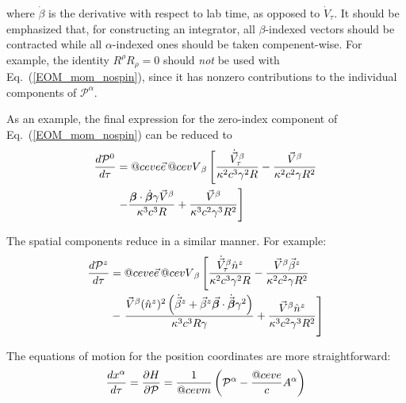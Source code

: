 \documentclass[reprint,
               amsmath,amssymb,nofootinbib, aps%
              ]{revtex4-2}
\makeatletter
\DeclareRobustCommand{\cev}[1]{%
  {\mathpalette\do@cev{#1}}%
}
\newcommand{\do@cev}[2]{%
  \vbox{\offinterlineskip
    \sbox\z@{$\m@th#1 x$}%
    \ialign{##\cr
      \hidewidth\reflectbox{$\m@th#1\vec{}\mkern4mu$}\hidewidth\cr
      \noalign{\kern-\ht\z@}
      $\m@th#1#2$\cr
    }%
  }%
}
\makeatother
\begin{document}
where $\dot{\beta}$ is the derivative with respect to lab time, as opposed to $\dot{V}_\tau$.
\noindent It should be emphasized that, for constructing an integrator, all $\beta$-indexed vectors should be contracted while all $\alpha$-indexed ones should be taken compenent-wise. For example, the identity $R^{\rho} R_{\rho} = 0 $ should \textit{not} be used with Eq.~(\ref{EOM_mom_nospin}), since it has nonzero contributions to the individual components of $\mathcal{P}^{\alpha}$.

As an example, the final expression for the zero-index component of Eq.~(\ref{EOM_mom_nospin}) can be reduced to 
\begin{align}
    \frac{d \mathcal{P}^0}{d \tau} &= 
    \cev{e}  \vec{e} \, \cev{V}_{\beta} \left[ 
    \frac{\dot{\vec{V}}^\beta_\tau} {\kappa^{2} c^{3} \gamma^{2} R}
    \nonumber - \frac{ \vec{V}^{\beta}} {\kappa^{2} c^{2} \gamma R^{2}} \right.
    \noindent \\
    & \left. -\frac{\boldsymbol{\beta}\cdot\dot{\boldsymbol{\beta}} \gamma \vec{V}^{\beta}}{\kappa^3 c^{3} R} 
    +  \frac{\vec{V}^{\beta} }{\kappa^3 c^{2} \gamma^{3} R^{2}}
    \right]
    \label{eq:eoms_mom_trans}
\end{align}

\noindent The spatial components reduce in a similar manner. For example:
\vspace{-0.2cm}
\begin{align}
    \frac{d \mathcal{P}^z}{d \tau} &= 
    \cev{e}  \vec{e} \, \cev{V}_{\beta} \left[ 
    \frac{\dot{\vec{V}}^\beta_\tau \hat{n}^{z}} {\kappa^2 c^{3} \gamma^{2} R}
    \nonumber - \frac{ \vec{V}^{\beta} \vec{\beta}^{z}} {\kappa^2 c^{2} \gamma R^{2}} \right.
    \noindent \\
    &- \left. \frac{ \vec{V}^{\beta} (\hat{n}^z)^2 \left(\dot{\vec{\beta}}^z + \vec{\beta}^z \vec{\boldsymbol{\beta}}\cdot\dot{\vec{\boldsymbol{\beta}}} \gamma^{2}\right)}{\kappa^3 c^{3} R \gamma} 
    +  \frac{\vec{V}^{\beta} \hat{n}^{z} }{\kappa^3 c^{2} \gamma^{3} R^{2}}
    \right]
    \label{eq:eoms_mom_long}
\end{align}

The equations of motion for the position coordinates are more straightforward:
\vspace{0.1cm}
\begin{equation}
\frac{d x^{\alpha}}{d \tau}= \frac{\partial H}{\partial \mathcal{P}} = \frac{1}{\cev{m}}\left(\mathcal{P}^{\alpha}-\frac{\cev{e}}{c} A^{\alpha}\right) 
\label{eq:eoms_pos}
\end{equation}
\end{document}
